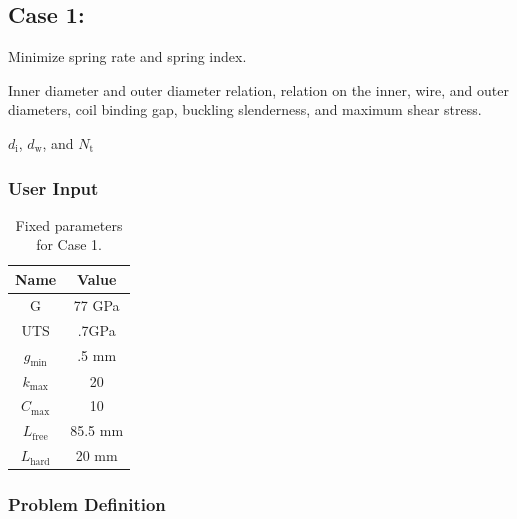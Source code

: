 \documentclass[10pt]{article}
\begin{document}
\subsection{Case 1:}
\label{subsec:Case1}

\begin{description}[leftmargin=!,labelwidth=\widthof{\bfseries Design Variables:}, labelindent = 1cm]
 	\item [Objectives:] Minimize spring rate and spring index.\\

	\item[Constraints:] Inner diameter and outer diameter relation, relation on the inner, wire, and outer diameters, coil binding gap, buckling slenderness, and maximum shear stress. \\
	\item[Design Variables:] $d_{\text{i}}$, $d_{\text{w}}$, and $N_{\text{t}}$ \\
\end{description}

	\subsubsection{User Input}
	

	 \begin{table}[H]
	 \centering
	 	\caption{Fixed parameters for Case 1.}
	 	\begin{tabular}{c c}
		        \hline \hline 
		 	Name & Value\\
			 \hline
		 	 G & 77 GPa \\
			 UTS & .7GPa \\
			 $g_{\text{min}}$ & .5 mm\\ 
		 	 $k_{\text{max}}$ & 20\\
			 $C_{\text{max}}$ & 10\\
			 $L_{\text{free}}$ & 85.5 mm\\
			 $L_{\text{hard}}$ & 20 mm\\
			\hline \hline
		\end{tabular}
	 \end{table}


	

	\subsubsection{Problem Definition}
	
\end{document}
